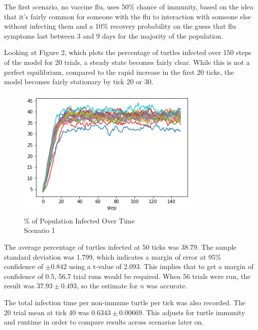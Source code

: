\documentclass[11pt]{article} %
\begin{document}
The first scenario, no vaccine flu, uses 50\% chance of immunity, based on the idea that it's fairly common for someone with the flu to interaction with someone else without infecting them and a 10\% recovery probability on the guess that flu symptoms last between 3 and 9 days for the majority of the population.


Looking at Figure 2, which plots the percentage of turtles infected over 150 steps of the model for 20 trials, a steady state becomes fairly clear. While this is not a perfect equilibrium, compared to the rapid increase in the first 20 ticks, the model becomes fairly stationary by tick 20 or 30.   

\begin{figure}
\centering
\includegraphics[width=0.8\textwidth]{scen_1_steady_state}
\caption{\% of Population Infected Over Time \\ Scenario 1}
\end{figure}



The average percentage of turtles infected at 50 ticks was 38.79. The sample standard deviation was 1.799, which indicates a margin of error at 95\% confidence of $\pm 0.842$ using a t-value of 2.093. This implies that to get a margin of confidence of 0.5, 56.7 trial runs would be required. When 56 trials were run, the result was $37.93 \pm 0.493$, so the estimate for $n$ was accurate. 

The total infection time per non-immune turtle per tick was also recorded. The 20 trial mean at tick 40 was $0.6343 \pm 0.00669$. This adjusts for turtle immunity and runtime in order to compare results across scenarios later on. 
\end{document}
